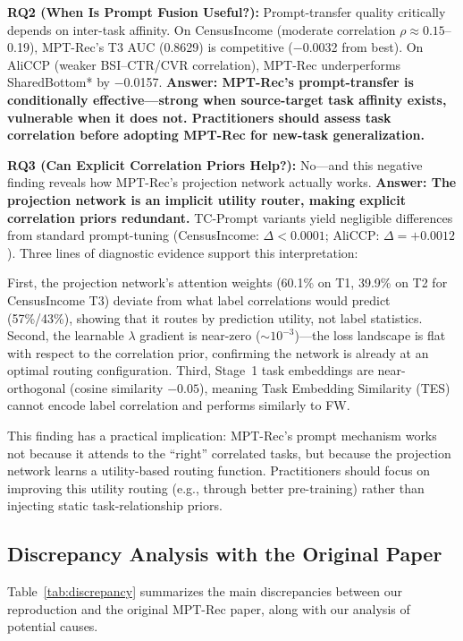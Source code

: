 \documentclass[review,anonymous]{acmart}
\begin{document}
\textbf{RQ2 (When Is Prompt Fusion Useful?):} Prompt-transfer quality
critically depends on inter-task affinity. On CensusIncome (moderate correlation
$\rho \approx 0.15$--0.19), MPT-Rec's T3 AUC (0.8629) is competitive
($-$0.0032 from best). On AliCCP (weaker BSI--CTR/CVR correlation), MPT-Rec
underperforms SharedBottom* by $-$0.0157. \textbf{Answer: MPT-Rec's
prompt-transfer is conditionally effective---strong when source-target task
affinity exists, vulnerable when it does not. Practitioners should assess task
correlation before adopting MPT-Rec for new-task generalization.}

\textbf{RQ3 (Can Explicit Correlation Priors Help?):} No---and this negative
finding reveals how MPT-Rec's projection network actually works. \textbf{Answer:
The projection network is an implicit utility router, making explicit correlation
priors redundant.} TC-Prompt variants yield negligible differences from standard
prompt-tuning (CensusIncome: $\Delta < 0.0001$; AliCCP: $\Delta = +0.0012$).
Three lines of diagnostic evidence support this interpretation:

First, the projection network's attention weights (60.1\% on T1, 39.9\% on T2
for CensusIncome T3) deviate from what label correlations would predict
(57\%/43\%), showing that it routes by prediction utility, not label statistics.
Second, the learnable $\lambda$ gradient is near-zero ($\sim10^{-3}$)---the loss
landscape is flat with respect to the correlation prior, confirming the network
is already at an optimal routing configuration. Third, Stage~1 task embeddings
are near-orthogonal (cosine similarity $-0.05$), meaning Task Embedding
Similarity (TES) cannot encode label correlation and performs similarly to FW.

This finding has a practical implication: MPT-Rec's prompt mechanism works not
because it attends to the ``right'' correlated tasks, but because the projection
network learns a utility-based routing function. Practitioners should focus on
improving this utility routing (e.g., through better pre-training) rather than
injecting static task-relationship priors.

\subsection{Discrepancy Analysis with the Original Paper}

Table~\ref{tab:discrepancy} summarizes the main discrepancies between our
reproduction and the original MPT-Rec paper, along with our analysis of potential
causes.
\end{document}
